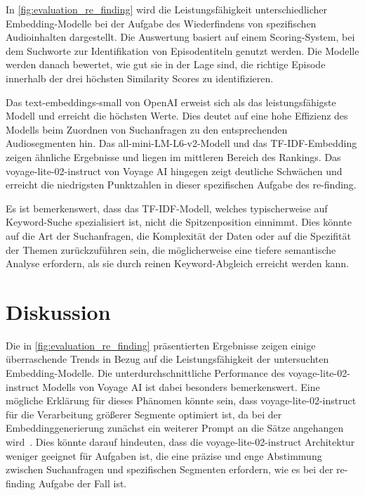 In \autoref{fig:evaluation_re_finding} wird die Leistungsfähigkeit unterschiedlicher Embedding-Modelle bei der Aufgabe des Wiederfindens von spezifischen Audioinhalten dargestellt. 
Die Auswertung basiert auf einem Scoring-System, bei dem Suchworte zur Identifikation von Episodentiteln genutzt werden. 
Die Modelle werden danach bewertet, wie gut sie in der Lage sind, die richtige Episode innerhalb der drei höchsten Similarity Scores zu identifizieren.

Das text-embeddings-small von OpenAI erweist sich als das leistungsfähigste Modell und erreicht die höchsten Werte. 
Dies deutet auf eine hohe Effizienz des Modells beim Zuordnen von Suchanfragen zu den entsprechenden Audiosegmenten hin. 
Das all-mini-LM-L6-v2-Modell und das TF-IDF-Embedding zeigen ähnliche Ergebnisse und liegen im mittleren Bereich des Rankings. 
Das voyage-lite-02-instruct von Voyage AI hingegen zeigt deutliche Schwächen und erreicht die niedrigsten Punktzahlen in dieser spezifischen Aufgabe des re-finding.

Es ist bemerkenswert, dass das TF-IDF-Modell, welches typischerweise auf Keyword-Suche spezialisiert ist, nicht die Spitzenposition einnimmt. 
Dies könnte auf die Art der Suchanfragen, die Komplexität der Daten oder auf die Spezifität der Themen zurückzuführen sein, die möglicherweise eine tiefere semantische Analyse erfordern, als sie durch reinen Keyword-Abgleich erreicht werden kann.


\section{Diskussion}

Die in \autoref{fig:evaluation_re_finding} präsentierten Ergebnisse zeigen einige überraschende  Trends in Bezug auf die Leistungsfähigkeit der untersuchten Embedding-Modelle. 
Die unterdurchschnittliche Performance des voyage-lite-02-instruct Modells von Voyage AI ist dabei besonders bemerkenswert. 
Eine mögliche Erklärung für dieses Phänomen könnte sein, dass voyage-lite-02-instruct für die Verarbeitung größerer Segmente optimiert ist, da bei der Embeddinggenerierung zunächst ein weiterer Prompt an die Sätze angehangen wird~\cite{zotero-572}. 
Dies könnte darauf hindeuten, dass die voyage-lite-02-instruct Architektur weniger geeignet für Aufgaben ist, die eine präzise und enge Abstimmung zwischen Suchanfragen und spezifischen Segmenten erfordern, wie es bei der re-finding Aufgabe der Fall ist.

